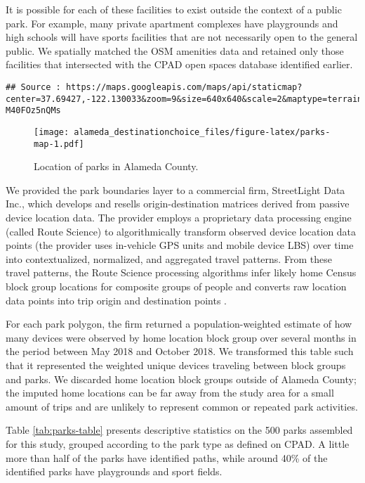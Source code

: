 \documentclass[]{elsarticle} %
\makeatletter
\def\maxwidth{\ifdim\Gin@nat@width>\linewidth\linewidth
\else\Gin@nat@width\fi}
\let\Oldincludegraphics\includegraphics
\renewcommand{\includegraphics}[1]{\Oldincludegraphics[width=\maxwidth]{#1}}
\makeatother
\begin{document}
It is possible for each of these facilities to exist outside the context of
a public park. For example, many private apartment complexes have playgrounds
and high schools will have sports facilities that are not necessarily open to
the general public. We spatially matched the OSM amenities data and retained
only those facilities that intersected with the CPAD open spaces database
identified earlier.

\begin{verbatim}
## Source : https://maps.googleapis.com/maps/api/staticmap?center=37.69427,-122.130033&zoom=9&size=640x640&scale=2&maptype=terrain&key=xxx-M40FOz5nQMs
\end{verbatim}

\begin{figure}
\centering
\texttt{[image: alameda\_destinationchoice\_files/figure-latex/parks-map-1.pdf]}
\caption{\label{fig:parks-map}Location of parks in Alameda County.}
\end{figure}

We provided the park boundaries layer to a commercial firm, StreetLight Data
Inc., which develops and resells origin-destination matrices derived from
passive device location data. The provider employs a proprietary data processing
engine (called Route Science) to algorithmically transform observed device
location data points (the provider uses in-vehicle GPS units and mobile device
LBS) over time into contextualized, normalized, and aggregated travel patterns.
From these travel patterns, the Route Science processing algorithms infer likely
home Census block group locations for composite groups of people and converts
raw location data points into trip origin and destination points \citep{Pan2006, Friedrich2010}.

For each park polygon, the firm returned a population-weighted estimate of how
many devices were observed by home location block group over several months in
the period between May 2018 and October 2018. We transformed this table such
that it represented the weighted unique devices traveling between block groups
and parks. We discarded home location block groups outside of Alameda County;
the imputed home locations can be far away from the study area for a small
amount of trips and are unlikely to represent common or repeated park
activities.

Table \ref{tab:parks-table} presents descriptive statistics
on the 500 parks assembled for this study, grouped according to the
park type as defined on CPAD. A little more than half of the parks have
identified paths, while around 40\% of the identified parks have playgrounds and
sport fields.
\end{document}
